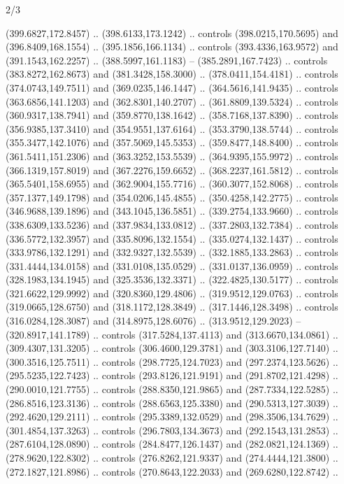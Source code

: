 \begin{flagdescription}{2/3}
\begin{scope}[xshift=0.5\flaglength,yshift=0.5\flagwidth,scale=\flagwidth/562]
\begin{scope}[y=1pt, x=1pt, yscale=-1,shift={(-421.88,-281.25)}]
  (399.6827,172.8457) .. (398.6133,173.1242) .. controls (398.0215,170.5695) and
  (396.8409,168.1554) .. (395.1856,166.1134) .. controls (393.4336,163.9572) and
  (391.1543,162.2257) .. (388.5997,161.1183) -- (385.2891,167.7423) .. controls
  (383.8272,162.8673) and (381.3428,158.3000) .. (378.0411,154.4181) .. controls
  (374.0743,149.7511) and (369.0235,146.1447) .. (364.5616,141.9435) .. controls
  (363.6856,141.1203) and (362.8301,140.2707) .. (361.8809,139.5324) .. controls
  (360.9317,138.7941) and (359.8770,138.1642) .. (358.7168,137.8390) .. controls
  (356.9385,137.3410) and (354.9551,137.6164) .. (353.3790,138.5744) .. controls
  (355.3477,142.1076) and (357.5069,145.5353) .. (359.8477,148.8400) .. controls
  (361.5411,151.2306) and (363.3252,153.5539) .. (364.9395,155.9972) .. controls
  (366.1319,157.8019) and (367.2276,159.6652) .. (368.2237,161.5812) .. controls
  (365.5401,158.6955) and (362.9004,155.7716) .. (360.3077,152.8068) .. controls
  (357.1377,149.1798) and (354.0206,145.4855) .. (350.4258,142.2775) .. controls
  (346.9688,139.1896) and (343.1045,136.5851) .. (339.2754,133.9660) .. controls
  (338.6309,133.5236) and (337.9834,133.0812) .. (337.2803,132.7384) .. controls
  (336.5772,132.3957) and (335.8096,132.1554) .. (335.0274,132.1437) .. controls
  (333.9786,132.1291) and (332.9327,132.5539) .. (332.1885,133.2863) .. controls
  (331.4444,134.0158) and (331.0108,135.0529) .. (331.0137,136.0959) .. controls
  (328.1983,134.1945) and (325.3536,132.3371) .. (322.4825,130.5177) .. controls
  (321.6622,129.9992) and (320.8360,129.4806) .. (319.9512,129.0763) .. controls
  (319.0665,128.6750) and (318.1172,128.3849) .. (317.1446,128.3498) .. controls
  (316.0284,128.3087) and (314.8975,128.6076) .. (313.9512,129.2023) --
  (320.8917,141.1789) .. controls (317.5284,137.4113) and (313.6670,134.0861) ..
  (309.4307,131.3205) .. controls (306.4600,129.3781) and (303.3106,127.7140) ..
  (300.3516,125.7511) .. controls (298.7725,124.7023) and (297.2374,123.5626) ..
  (295.5235,122.7423) .. controls (293.8126,121.9191) and (291.8702,121.4298) ..
  (290.0010,121.7755) .. controls (288.8350,121.9865) and (287.7334,122.5285) ..
  (286.8516,123.3136) .. controls (288.6563,125.3380) and (290.5313,127.3039) ..
  (292.4620,129.2111) .. controls (295.3389,132.0529) and (298.3506,134.7629) ..
  (301.4854,137.3263) .. controls (296.7803,134.3673) and (292.1543,131.2853) ..
  (287.6104,128.0890) .. controls (284.8477,126.1437) and (282.0821,124.1369) ..
  (278.9620,122.8302) .. controls (276.8262,121.9337) and (274.4444,121.3800) ..
  (272.1827,121.8986) .. controls (270.8643,122.2033) and (269.6280,122.8742) ..

\end{scope}
\end{scope}
\end{flagdescription}
